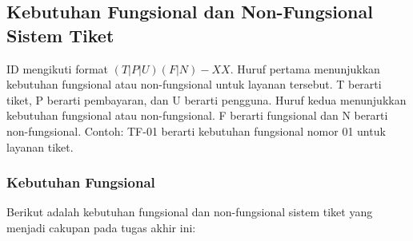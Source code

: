 \subsection{Kebutuhan Fungsional dan Non-Fungsional Sistem Tiket}

ID mengikuti format \((T|P|U)(F|N)-XX\). Huruf pertama menunjukkan kebutuhan fungsional atau non-fungsional untuk layanan tersebut. T berarti tiket, P berarti pembayaran, dan U berarti pengguna. Huruf kedua menunjukkan kebutuhan fungsional atau non-fungsional. F berarti fungsional dan N berarti non-fungsional. Contoh: TF-01 berarti kebutuhan fungsional nomor 01 untuk layanan tiket.

\subsubsection{Kebutuhan Fungsional}

Berikut adalah kebutuhan fungsional dan non-fungsional sistem tiket yang menjadi cakupan pada tugas akhir ini:

